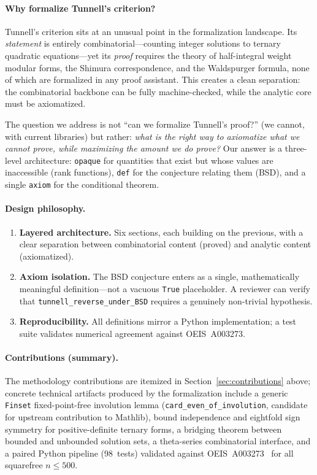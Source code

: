 \documentclass[11pt,a4paper]{article}
\theoremstyle{definition}
\newcommand{\lean}[1]{\texttt{#1}}
\begin{document}
\paragraph{Why formalize Tunnell's criterion?}
Tunnell's criterion sits at an unusual point in the formalization
landscape.  Its \emph{statement} is entirely combinatorial---counting
integer solutions to ternary quadratic equations---yet its
\emph{proof} requires the theory of half-integral weight modular
forms, the Shimura correspondence, and the Waldspurger formula, none
of which are formalized in any proof assistant.  This creates a clean
separation: the combinatorial backbone can be fully machine-checked,
while the analytic core must be axiomatized.

The question we address is not ``can we formalize Tunnell's proof?''
(we cannot, with current libraries) but rather: \emph{what is the
right way to axiomatize what we cannot prove, while maximizing the
amount we do prove?}  Our answer is a three-level architecture:
\lean{opaque} for quantities that exist but whose values are
inaccessible (rank functions), \lean{def} for the conjecture
relating them (BSD), and a single \lean{axiom} for the conditional
theorem.

\paragraph{Design philosophy.}
\begin{enumerate}[nosep]
  \item \textbf{Layered architecture.}  Six sections, each building
    on the previous, with a clear separation between combinatorial
    content (proved) and analytic content (axiomatized).
  \item \textbf{Axiom isolation.}  The BSD conjecture enters as a
    single, mathematically meaningful definition---not a vacuous
    \lean{True} placeholder.  A reviewer can verify that
    \lean{tunnell\_reverse\_under\_BSD} requires a genuinely
    non-trivial hypothesis.
  \item \textbf{Reproducibility.}  All definitions mirror a Python
    implementation; a test suite validates numerical agreement
    against OEIS~A003273.
\end{enumerate}

\paragraph{Contributions (summary).}
The methodology contributions are itemized in
Section~\ref{sec:contributions} above; concrete technical
artifacts produced by the formalization include a generic
\lean{Finset} fixed-point-free involution lemma
(\lean{card\_even\_of\_involution}, candidate for upstream
contribution to Mathlib), bound independence and eightfold sign
symmetry for positive-definite ternary forms, a bridging theorem
between bounded and unbounded solution sets, a theta-series
combinatorial interface, and a paired Python pipeline (98~tests)
validated against OEIS~A003273~\cite{OEIS_A003273} for all
squarefree $n \le 500$.
\end{document}
